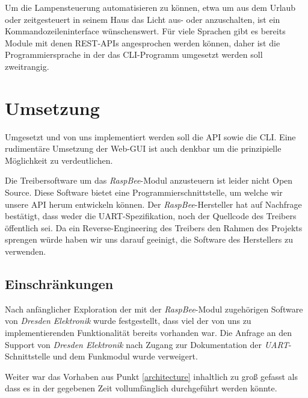 \documentclass[a4paper,12pt]{article}
\begin{document}
Um die Lampensteuerung automatisieren zu können, etwa um aus dem Urlaub oder
zeitgesteuert in seinem Haus das Licht aus- oder anzuschalten, ist ein
Kommandozeileninterface wünschenswert. Für viele Sprachen gibt es bereits
Module mit denen REST-APIs angesprochen werden können, daher ist die
Programmiersprache in der das CLI-Programm umgesetzt werden soll zweitrangig.

\newpage

\section{Umsetzung}
\label{doing}

Umgesetzt und von uns implementiert werden soll die API sowie die CLI. Eine
rudimentäre Umsetzung der Web-GUI ist auch denkbar um die prinzipielle
Möglichkeit zu verdeutlichen.

Die Treibersoftware um das \emph{RaspBee}-Modul anzusteuern ist leider nicht
Open Source. Diese Software bietet eine Programmierschnittstelle, um welche
wir unsere API herum entwickeln können. Der \emph{RaspBee}-Hersteller hat auf
Nachfrage bestätigt, dass weder die UART-Spezifikation, noch der Quellcode
des Treibers öffentlich sei. Da ein Reverse-Engineering des Treibers den Rahmen
des Projekts sprengen würde haben wir uns darauf geeinigt, die Software des
Herstellers zu verwenden.

\subsection{Einschränkungen}

Nach anfänglicher Exploration der mit der \emph{RaspBee}-Modul zugehörigen Software
von \emph{Dresden Elektronik} wurde festgestellt, dass viel der von uns zu
implementierenden Funktionalität bereits vorhanden war. Die Anfrage an den
Support von \emph{Dresden Elektronik} nach Zugang zur Dokumentation der
\emph{UART}-Schnittstelle und dem Funkmodul wurde verweigert.

Weiter war das Vorhaben aus Punkt \ref{architecture} inhaltlich zu groß gefasst
als dass es in der gegebenen Zeit vollumfänglich durchgeführt werden könnte.
\end{document}
